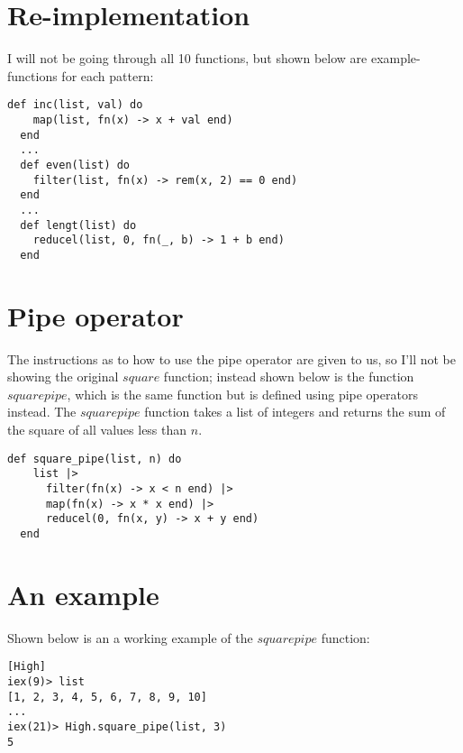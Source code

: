 \documentclass[a4paper,11pt]{article}
\begin{document}
\section*{Re-implementation}
I will not be going through all 10 functions, but shown below are example-functions for each pattern:
\begin{verbatim}
def inc(list, val) do
    map(list, fn(x) -> x + val end)
  end
  ...
  def even(list) do
    filter(list, fn(x) -> rem(x, 2) == 0 end)
  end
  ...
  def lengt(list) do
    reducel(list, 0, fn(_, b) -> 1 + b end)
  end
\end{verbatim} 


\section*{Pipe operator}
The instructions as to how to use the pipe operator are given to us, so I'll not be showing the original $square$ function; instead shown below is the function $squarepipe$, which is the same function but is defined using pipe operators instead. The $squarepipe$ function takes a list of integers and returns the sum of the square of all values less than $n$.
\begin{verbatim}
def square_pipe(list, n) do
    list |>
      filter(fn(x) -> x < n end) |>
      map(fn(x) -> x * x end) |>
      reducel(0, fn(x, y) -> x + y end)
  end
\end{verbatim} 

\section*{An example}
Shown below is an a working example of the $squarepipe$ function:
\begin{verbatim}
[High]
iex(9)> list
[1, 2, 3, 4, 5, 6, 7, 8, 9, 10]
...
iex(21)> High.square_pipe(list, 3)
5
\end{verbatim} 
\end{document}
